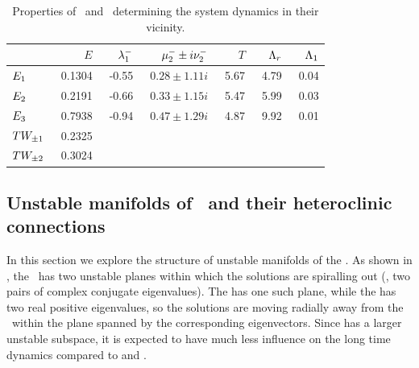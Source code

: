 \begin{table}[h!]
    \caption{Properties of \eqva\ and \reqva\ determining the system dynamics in their vicinity.}
\begin{center} \footnotesize
    \begin{tabular}{l|rrrrrr}
             & $E$     &$\eigExp[1]^-$ & $\eigRe[2]^-\pm i \eigIm[2]^-$   & $T$ & $\ExpaEig_r$  & $\ExpaEig_1$  \\ \hline
 $\EQV{1}\ $ &\ 0.1304 &\ -0.55        &\ $0.28\pm1.11i$       &\ 5.67     &\ 4.79     &\ 0.04 \\
 $\EQV{2}\ $ &\ 0.2191 &\ -0.66        &\ $0.33\pm1.15i$       &\ 5.47     &\ 5.99     &\ 0.03 \\
 $\EQV{3}\ $ &\ 0.7938 &\ -0.94        &\ $0.47\pm1.29i$       &\ 4.87     &\ 9.92     &\ 0.01 \\
 $\REQV{\pm}{1}$ &\ 0.2325 &  &  &  &  & \\
 $\REQV{\pm}{2}$ &\ 0.3024 &  &  &  &  & \\
    \end{tabular}
\end{center}
\label{tab:L22cminus}
\end{table}

\subsection{Unstable manifolds of \eqva\ and their heteroclinic
            connections}
\label{sec:unstMnflds}

In this section we explore the structure of unstable
manifolds of the {\eqva}.  As shown in , 
the  \eqv\ has two unstable
planes within which the solutions are spiralling out (\ie, two
pairs of complex conjugate eigenvalues).  The  has one such plane,
while the  has two real positive eigenvalues, so the solutions are
moving radially away from the \eqv\ within the plane spanned
by the corresponding eigenvectors.  Since  has
a larger unstable subspace, it is expected to have much less influence on the
long time dynamics compared to  and .

